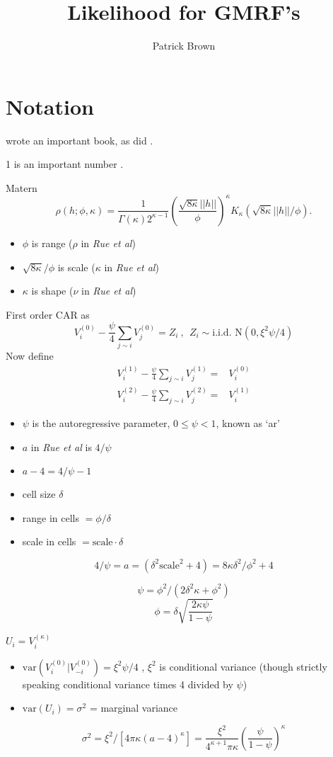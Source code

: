 \documentclass[12pt]{article}
\title{Likelihood for GMRF's}
\author{Patrick Brown}
\begin{document}
\section{Notation}

\citet{rue2005gaussian} wrote an important book, as did \citet{geostats}.

1 is an important number \citep{rue2005gaussian}.

Matern
\[
\rho(h; \phi, \kappa) = \frac{1}{\Gamma(\kappa)2^{\kappa-1}}\left(\frac{\sqrt{8\kappa}||h||}{\phi}\right)^\kappa
K_\kappa\left(\sqrt{8\kappa}||h||/\phi\right).
\]

\begin{itemize}
  \item $\phi$ is range ($\rho$ in \textit{Rue et al})
  \item $\sqrt{8\kappa}/\phi$ is scale ($\kappa$ in \textit{Rue et al})
  \item $\kappa$ is shape ($\nu$ in \textit{Rue et al})
\end{itemize}


First order CAR as
\[
V^{(0)}_i - \frac{\psi}{4}\sum_{j\sim i} V^{(0)}_j =  Z_i \ , \ \
Z_i \sim  \text{i.i.d.\ N}(0, \xi^2\psi/4)
\]
Now define
\begin{align*}
V^{(1)}_i - \frac{\psi}{4}\sum_{j\sim i} V^{(1)}_j = & V^{(0)}_i\\
V^{(2)}_i -\frac{\psi}{4}\sum_{j\sim i} V^{(2)}_j = & V^{(1)}_i
\end{align*}


\begin{itemize}
  \item $\psi$ is the autoregressive parameter, $0\leq\psi < 1$, known as `ar'
  \item $a$ in \textit{Rue et al} is $4/\psi$
  \item $a-4 = 4/\psi-1$
  \item cell size $\delta$
    \item range in cells $ = \phi/ \delta$
  \item scale in cells $=\text{scale}\cdot\delta$
\end{itemize}

\[
	4/\psi = a = (\delta^2\text{scale}^2 + 4) = 8 \kappa \delta^2 / \phi^2 + 4
\]

\[
\psi = \phi^2/(2 \delta^2 \kappa + \phi^2)
\]
\[
\phi =  \delta \sqrt{\frac{2\kappa\psi}{1-\psi}}
\]


$U_i = V^{(\kappa)}_i$


\begin{itemize}
  \item $\text{var}(V^{(0)}_i | V^{(0)}_{-i}) = \xi^2\psi/4$ , $\xi^2$ is conditional
  variance (though strictly speaking conditional variance times 4 divided by
  $\psi$)
  \item $\text{var}(U_i) = \sigma^2$ = marginal variance
\end{itemize}
\[
\sigma^2 =  \xi^2/[4\pi\kappa(a-4)^\kappa] =
\frac{\xi^2}{ 4^{\kappa+1}\pi\kappa} \left(\frac{\psi}{1-\psi}\right)^\kappa
\]
\end{document}
